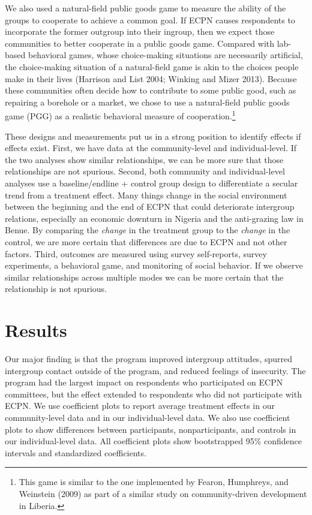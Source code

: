 \documentclass[11pt]{article}
\begin{document}
We also used a natural-field public goods game to measure the ability of
the groups to cooperate to achieve a common goal. If ECPN causes
respondents to incorporate the former outgroup into their ingroup, then
we expect those communities to better cooperate in a public goods game.
Compared with lab-based behavioral games, whose choice-making situations
are necessarily artificial, the choice-making situation of a
natural-field game is akin to the choices people make in their lives
(Harrison and List 2004; Winking and Mizer 2013). Because these
communities often decide how to contribute to some public good, such as
repairing a borehole or a market, we chose to use a natural-field public
goods game (PGG) as a realistic behavioral measure of
cooperation.\footnote{This game is similar to the one implemented by
  Fearon, Humphreys, and Weinstein (2009) as part of a similar study on
  community-driven development in Liberia.}

These designs and measurements put us in a strong position to identify
effects if effects exist. First, we have data at the community-level and
individual-level. If the two analyses show similar relationships, we can
be more sure that those relationships are not spurious. Second, both
community and individual-level analyses use a baseline/endline + control
group design to differentiate a secular trend from a treatment effect.
Many things change in the social environment between the beginning and
the end of ECPN that could deteriorate intergroup relations, especially
an economic downturn in Nigeria and the anti-grazing law in Benue. By
comparing the \emph{change} in the treatment group to the \emph{change}
in the control, we are more certain that differences are due to ECPN and
not other factors. Third, outcomes are measured using survey
self-reports, survey experiments, a behavioral game, and monitoring of
social behavior. If we observe similar relationships across multiple
modes we can be more certain that the relationship is not spurious.

\hypertarget{results}{%
\section{Results}\label{results}}

Our major finding is that the program improved intergroup attitudes,
spurred intergroup contact outside of the program, and reduced feelings
of insecurity. The program had the largest impact on respondents who
participated on ECPN committees, but the effect extended to respondents
who did not participate with ECPN. We use coefficient plots to report
average treatment effects in our community-level data and in our
individual-level data. We also use coefficient plots to show differences
between participants, nonparticipants, and controls in our
individual-level data. All coefficient plots show bootstrapped 95\%
confidence intervals and standardized coefficients.
\end{document}
